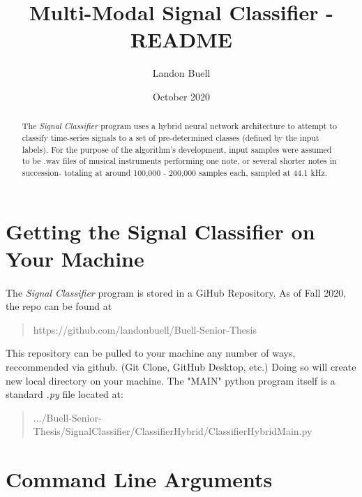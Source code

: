 \documentclass[12pt,letterpaper]{article}
\begin{document}

\title{Multi-Modal Signal Classifier - README}
\author{Landon Buell}
\date{October 2020}
\maketitle

\begin{abstract}
The \textit{Signal Classifier} program uses a hybrid neural network architecture to attempt to classify time-series signals to a set of pre-determined classes (defined by the input labels). For the purpose of the algorithm's development, input samples were assumed to be .wav files of musical instruments performing one note, or several shorter notes in succession- totaling at around 100,000 - 200,000 samples each, sampled at 44.1 kHz.
\end{abstract}


\section{Getting the Signal Classifier on Your Machine}

\paragraph*{}The \textit{Signal Classifier} program is stored in a GiHub Repository. As of Fall 2020, the repo can be found at
\begin{quote}
https://github.com/landonbuell/Buell-Senior-Thesis
\end{quote}
This repository can be pulled to your machine any number of ways, reccommended via github. (Git Clone, GitHub Desktop, etc.) Doing so will create new local directory on your machine. The "MAIN" python program itself is a standard \textit{.py} file located at:
\begin{quote}
.../Buell-Senior-Thesis/SignalClassifier/ClassifierHybrid/ClassifierHybridMain.py
\end{quote}


\section{Command Line Arguments}
\end{document}
